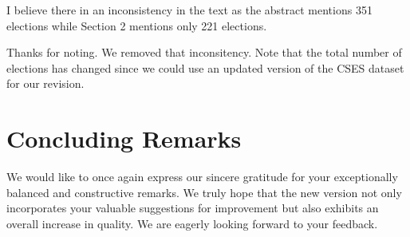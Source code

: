 \documentclass[a4paper, 12pt]{scrartcl}
\theoremstyle{break}
\newenvironment{changes}{\par\color{violet}\par\addvspace{\baselineskip}}{\par\addvspace{\baselineskip}}
\begin{document}
\begin{changes}
	I believe there in an inconsistency in the text as the abstract mentions 351 elections while Section 2 mentions only 221 elections.
\end{changes}

Thanks for noting. We removed that inconsitency. Note that the total number of elections has changed since we could use an updated version of the CSES dataset for our revision.


\newpage
\section{Concluding Remarks}

We would like to once again express our sincere gratitude for your exceptionally balanced and constructive remarks. We truly hope that the new version not only incorporates your valuable suggestions for improvement but also exhibits an overall increase in quality. We are eagerly looking forward to your feedback.



\end{document}
